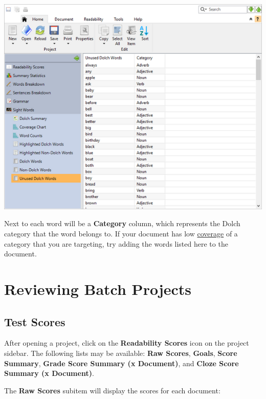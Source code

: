 \documentclass[
]{book}
\theoremstyle{definition}
\theoremstyle{definition}
\theoremstyle{definition}
\theoremstyle{definition}
\theoremstyle{remark}
\begin{document}
\includegraphics{Images/dolchunusedwordslist.png}

Next to each word will be a \textbf{Category} column, which represents the Dolch category that the word belongs to. If your document has low \protect\hyperlink{reviewing-dolch}{coverage} of a category that you are targeting, try adding the words listed here to the document.

\hypertarget{reviewing-batch-projects}{%
\chapter{Reviewing Batch Projects}\label{reviewing-batch-projects}}

\hypertarget{reviewing-batch-scores}{%
\section{Test Scores}\label{reviewing-batch-scores}}

After opening a project, click on the \textbf{Readability Scores} icon on the project sidebar. The following lists may be available: \textbf{Raw Scores}, \textbf{Goals}, \textbf{Score Summary}, \textbf{Grade Score Summary (x Document)}, and \textbf{Cloze Score Summary (x Document)}.

The \textbf{Raw Scores} subitem will display the scores for each document:
\end{document}
